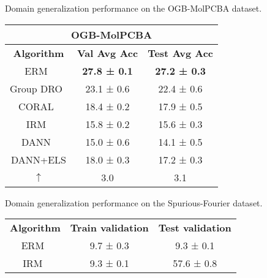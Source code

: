 \documentclass{article} \usepackage{iclr2023_conference,times}
\newcommand{\abbr}[0]{DANN+ELS\xspace}
\newcommand{\Gray}[0]{\rowcolor{gray!20}}
\begin{document}
\begin{minipage}{\textwidth}
\centering
 \begin{minipage}[t]{0.48\textwidth}
  \centering
  \tiny
\makeatletter{}\makeatother\caption{Domain generalization performance on the OGB-MolPCBA dataset.}\label{tab:main_graph2}
\begin{tabular}{@{}ccc@{}}
\toprule
\multicolumn{3}{c}{{\color{brown}\textbf{OGB-MolPCBA}}}                                            \\ \midrule
\textbf{Algorithm} & \textbf{Val Avg Acc} & \textbf{Test Avg Acc} \\
ERM~\citep{vapnik1998statistical}                 &\textbf{ 27.8 ± 0.1 }                & \textbf{27.2 ± 0.3}                  \\
Group DRO~\cite{sagawa2020distributionally}            & 23.1 ± 0.6                 & 22.4 ± 0.6                  \\
CORAL~\cite{sun2016deep}              & 18.4 ± 0.2                 & 17.9 ± 0.5                  \\
IRM~\citep{arjovsky2020invariant}                 & 15.8 ± 0.2                 & 15.6 ± 0.3                  \\
DANN~\citep{ganin2016domain}                & 15.0 ± 0.6              & 14.1 ± 0.5               \\\Gray
\abbr               & 18.0 ± 0.3              & 17.2 ± 0.3               \\\Gray
$\uparrow$         & 3.0                       & 3.1                        \\ \bottomrule
\end{tabular}
  \end{minipage}
  \begin{minipage}[t]{0.48\textwidth}
   \centering
   \tiny
\makeatletter{}\makeatother\caption{Domain generalization performance on the Spurious-Fourier dataset.}\label{tab:sp_fourier}
 \begin{tabular}{@{}
>{\columncolor[HTML]{FFFFFF}}c 
>{\columncolor[HTML]{FFFFFF}}c 
>{\columncolor[HTML]{FFFFFF}}c @{}}
\toprule
\multicolumn{3}{c}{{\color{brown}\textbf{Spurious-Fourier dataset}}}        \\ \midrule
\textbf{Algorithm }           & \textbf{Train validation} & \textbf{Test validation} \\
ERM~\citep{vapnik1998statistical}                   & 9.7 ± 0.3               & 9.3 ± 0.1              \\
IRM~\citep{arjovsky2020invariant}                  & 9.3 ± 0.1               & 57.6 ± 0.8             \\

\end{tabular}
\end{minipage}
\end{minipage}
\end{document}
